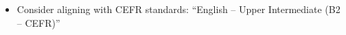 \begin{itemize}[leftmargin=*]
  \item Consider aligning with CEFR standards: “English – Upper Intermediate (B2 – CEFR)”
\end{itemize}